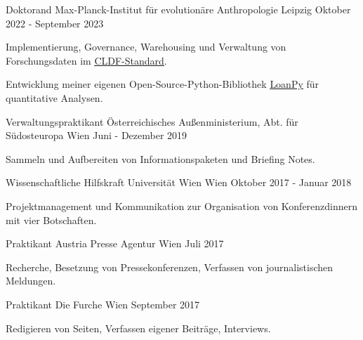 \begin{cventries}

  \cventry
    {Doktorand} %
    {Max-Planck-Institut für evolutionäre Anthropologie} %
    {Leipzig} %
    {Oktober 2022 - September 2023} %
    {
      \begin{cvitems} %
      \item{Implementierung, Governance, Warehousing und Verwaltung von Forschungsdaten im \underline{\href{https://cldf.clld.org/}{CLDF-Standard}}.}
      \item{Entwicklung meiner eigenen Open-Source-Python-Bibliothek \underline{\href{https://pypi.org/project/loanpy/}{LoanPy}} für quantitative Analysen.}
      \end{cvitems}
    }
    
  \cventry
    {Verwaltungspraktikant} %
    {Österreichisches Außenministerium, Abt. für Südosteuropa} %
    {Wien} %
    {Juni - Dezember 2019} %
    {
      \begin{cvitems} %
        \item{Sammeln und Aufbereiten von Informationspaketen und Briefing Notes.}
      \end{cvitems}
    }

  \cventry
    {Wissenschaftliche Hilfskraft} %
    {Universität Wien} %
    {Wien} %
    {Oktober 2017 - Januar 2018} %
    {
    \begin{cvitems}
    \item{Projektmanagement und Kommunikation zur Organisation von Konferenzdinnern mit vier Botschaften.}
    \end{cvitems}
    }
    
  \cventry
    {Praktikant} %
    {Austria Presse Agentur} %
    {Wien} %
    {Juli 2017} %
    {
    \begin{cvitems}
    \item{Recherche, Besetzung von Pressekonferenzen, Verfassen von journalistischen Meldungen.}
    \end{cvitems}
    }

  \cventry
    {Praktikant} %
    {Die Furche} %
    {Wien} %
    {September 2017} %
    {
    \begin{cvitems}
    \item{Redigieren von Seiten, Verfassen eigener Beiträge, Interviews.}
    \end{cvitems}
    }
       

\end{cventries}
